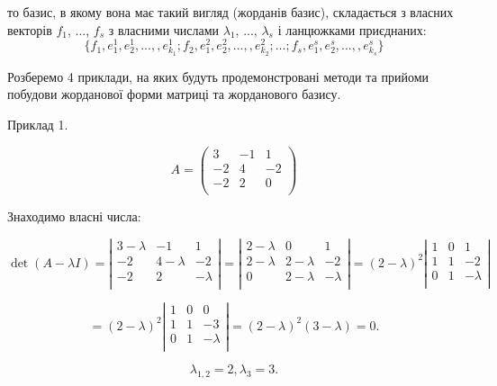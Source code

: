 то базис, в якому вона має такий вигляд (жорданів базис), складається з
власних векторів $f_1$, ..., $f_s$ з власними числами $\lambda_1$, ..., $\lambda_s$ і ланцюжками
приєднаних:
\begin{equation*}
    \{ f_1, e_1^1, e_2^1, ..., , e_{k_1}^1;
    f_2, e_1^2, e_2^2, ..., , e_{k_2}^2;
    ...;
    f_s, e_1^s, e_2^s, ..., , e_{k_s}^s \}
\end{equation*}

Розберемо 4 приклади, на яких будуть продемонстровані методи та
прийоми побудови жорданової форми матриці та жорданового базису.

Приклад 1.

$$A = \begin{pmatrix}
	 3 & -1 &  1 \\
	-2 &  4 & -2 \\
	-2 &  2 &  0 \\
\end{pmatrix} $$

Знаходимо власні числа:

$$\det(A - \lambda I) = \left| \begin{matrix}
	3 - \lambda & -1          & 1 \\
	-2          & 4 - \lambda & -2 \\
	-2          & 2           & -\lambda\\
\end{matrix} \right| = \left| \begin{matrix}
	2 - \lambda & 0           & 1 \\
	2 - \lambda & 2 - \lambda & -2 \\
	0           & 2 - \lambda & -\lambda\\
\end{matrix} \right| = (2 - \lambda)^2 \left| \begin{matrix}
	1 & 0 & 1 \\
	1 & 1 & -2 \\
	0 & 1 & -\lambda\\
\end{matrix} \right|$$

$$= (2 - \lambda)^2 \left| \begin{matrix}
	1 & 0 & 0 \\
	1 & 1 & -3 \\
	0 & 1 & -\lambda\\
\end{matrix} \right|
= (2 - \lambda)^2 (3 - \lambda) = 0.$$

$$\lambda_{1,2} = 2, \lambda_{3} = 3.$$

